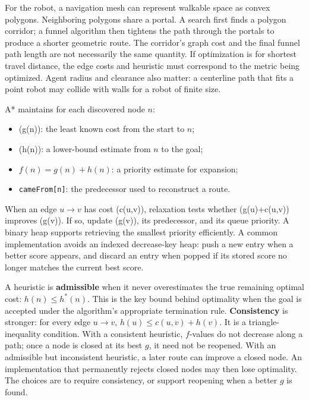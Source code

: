 For the robot, a navigation mesh can represent walkable space as convex polygons. Neighboring polygons share a portal. A search first finds a polygon corridor; a funnel algorithm then tightens the path through the portals to produce a shorter geometric route. The corridor's graph cost and the final funnel path length are not necessarily the same quantity. If optimization is for shortest travel distance, the edge costs and heuristic must correspond to the metric being optimized. Agent radius and clearance also matter: a centerline path that fits a point robot may collide with walls for a robot of finite size.

A* maintains for each discovered node \(n\):

\begin{itemize}
\tightlist
\item
  (g(n)): the least known cost from the start to \(n\);
\item
  (h(n)): a lower-bound estimate from \(n\) to the goal;
\item
  \(f(n)=g(n)+h(n)\): a priority estimate for expansion;
\item
  \texttt{cameFrom{[}n{]}}: the predecessor used to reconstruct a route.
\end{itemize}

When an edge \(u\rightarrow v\) has cost (c(u,v)), relaxation tests whether (g(u)+c(u,v)) improves (g(v)). If so, update (g(v)), its predecessor, and its queue priority. A binary heap supports retrieving the smallest priority efficiently. A common implementation avoids an indexed decrease-key heap: push a new entry when a better score appears, and discard an entry when popped if its stored score no longer matches the current best score.

A heuristic is \textbf{admissible} when it never overestimates the true remaining optimal cost: \(h(n)\leq h^*(n)\). This is the key bound behind optimality when the goal is accepted under the algorithm's appropriate termination rule. \textbf{Consistency} is stronger: for every edge \(u\rightarrow v\), \(h(u)\leq c(u,v)+h(v)\). It is a triangle-inequality condition. With a consistent heuristic, \(f\)-values do not decrease along a path; once a node is closed at its best \(g\), it need not be reopened. With an admissible but inconsistent heuristic, a later route can improve a closed node. An implementation that permanently rejects closed nodes may then lose optimality. The choices are to require consistency, or support reopening when a better \(g\) is found.

